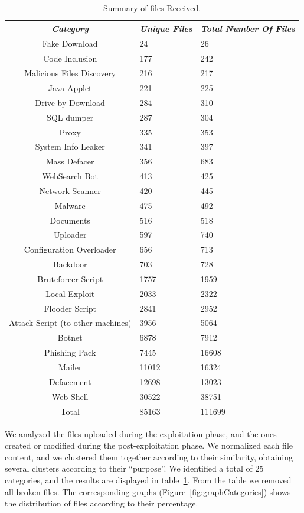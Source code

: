 \begin{table}[tbh] %
\begin{center}
\begin{tabularx}{\textwidth}{|c|X|X|}
\hline
\textit{Category} & \textit{Unique Files} & \textit{Total Number Of Files} \\
\hline
Fake Download & 24 & 26 \\
Code Inclusion & 177 & 242 \\
Malicious Files Discovery & 216 & 217 \\
Java Applet & 221 & 225 \\
Drive-by Download & 284 & 310 \\
SQL dumper & 287 & 304 \\
Proxy & 335 & 353 \\
System Info Leaker & 341 & 397 \\
Mass Defacer & 356 & 683 \\
WebSearch Bot & 413 & 425 \\
Network Scanner & 420 & 445 \\
Malware & 475 & 492 \\
Documents & 516 & 518 \\
Uploader & 597 & 740 \\
Configuration Overloader & 656 & 713 \\
Backdoor & 703 & 728 \\
Bruteforcer Script & 1757 & 1959 \\
Local Exploit & 2033 & 2322 \\
Flooder Script & 2841 & 2952 \\
Attack Script (to other machines) & 3956 & 5064 \\
Botnet & 6878 & 7912 \\
Phishing Pack & 7445 & 16608 \\
Mailer & 11012 & 16324 \\
Defacement & 12698 & 13023 \\
Web Shell & 30522 & 38751 \\
\hline \hline
Total & 85163 & 111699 \\
\hline
\end{tabularx}
\caption{Summary of files Received.\label{tab:fileCategories}}
\end{center}
\end{table}

We analyzed the files uploaded during the exploitation phase, and the ones created or modified during the post-exploitation phase. We normalized each file content, and we clustered them together according to their similarity, obtaining several clusters according to their ``purpose''. We identified a total of 25 categories, and the results are displayed in table~\ref{tab:fileCategories}. From the table we removed all broken files. The corresponding graphs (Figure~\ref{fig:graphCategories}) shows the distribution of files according to their percentage.

